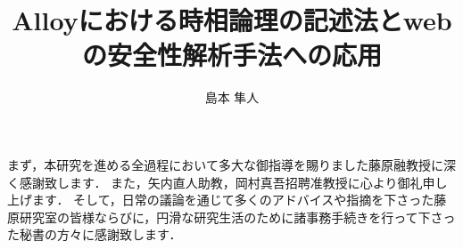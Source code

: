 \documentclass[12pt,a4paper]{jbook}
\title{Alloyにおける時相論理の記述法とwebの安全性解析手法への応用}
\author{島本 隼人}
\begin{document}
\coverpage
\tableofcontents
\listoffigures
\listoftables
\body









\acknowledgement
まず，本研究を進める全過程において多大な御指導を賜りました藤原融教授に深く感謝致します．
また，矢内直人助教，岡村真吾招聘准教授に心より御礼申し上げます．
そして，日常の議論を通じて多くのアドバイスや指摘を下さった藤原研究室の皆様ならびに，円滑な研究生活のために諸事務手続きを行って下さった秘書の方々に感謝致します．


 
\end{document}
